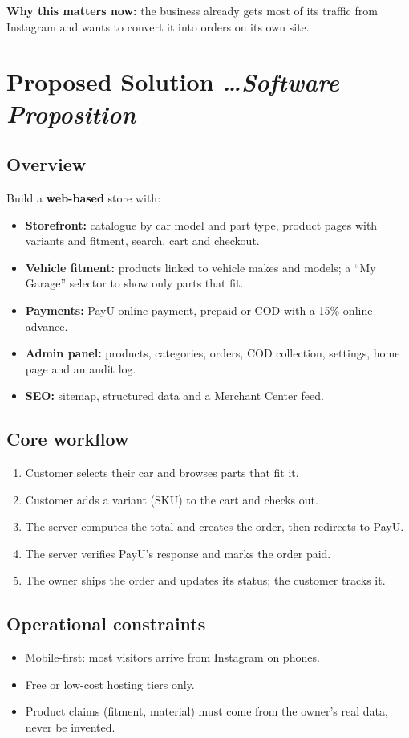 \documentclass[11pt,a4paper]{article}
\newcommand{\BvrHint}[1]{%
  {\normalfont\normalsize\itshape\hfill #1}}
\begin{document}
\textbf{Why this matters now:} the business already gets most of its traffic
from Instagram and wants to convert it into orders on its own site.

\section{Proposed Solution %
\BvrHint{\ldots Software Proposition}}
\subsection{Overview}
Build a \textbf{web-based} store with:
\begin{itemize}[leftmargin=0.7cm]
    \item \textbf{Storefront:} catalogue by car model and part type, product
          pages with variants and fitment, search, cart and checkout.
    \item \textbf{Vehicle fitment:} products linked to vehicle makes and models;
          a ``My Garage'' selector to show only parts that fit.
    \item \textbf{Payments:} PayU online payment, prepaid or COD with a 15\%
          online advance.
    \item \textbf{Admin panel:} products, categories, orders, COD collection,
          settings, home page and an audit log.
    \item \textbf{SEO:} sitemap, structured data and a Merchant Center feed.
\end{itemize}

\subsection{Core workflow}
\begin{enumerate}[leftmargin=0.7cm]
    \item Customer selects their car and browses parts that fit it.
    \item Customer adds a variant (SKU) to the cart and checks out.
    \item The server computes the total and creates the order, then redirects to
          PayU.
    \item The server verifies PayU's response and marks the order paid.
    \item The owner ships the order and updates its status; the customer tracks it.
\end{enumerate}

\subsection{Operational constraints}
\begin{itemize}[leftmargin=0.7cm]
    \item Mobile-first: most visitors arrive from Instagram on phones.
    \item Free or low-cost hosting tiers only.
    \item Product claims (fitment, material) must come from the owner's real
          data, never be invented.
\end{itemize}
\end{document}

